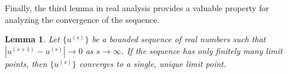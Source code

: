 \documentclass[sn-mathphys-num]{sn-jnl}%
\newtheorem{lemma}{Lemma}[section]
\theoremstyle{thmstyleone}%
\theoremstyle{thmstyletwo}%
\theoremstyle{thmstylethree}%
\begin{document}





Finally, the third lemma in real analysis provides a valuable property for analyzing the convergence of the sequence.
\begin{lemma}\label{lemma:conv}\cite[Lemma 4.4]{Chu93}
 Let $\{u^{(s)}\}$ be a bounded sequence of real numbers such that $|u^{(s+1)} - u^{(s)}| \to 0$ as $s \to \infty$. If the sequence has only finitely many limit points, then $\{u^{(s)}\}$ converges to a single, unique limit point.
\end{lemma}






\end{document}
